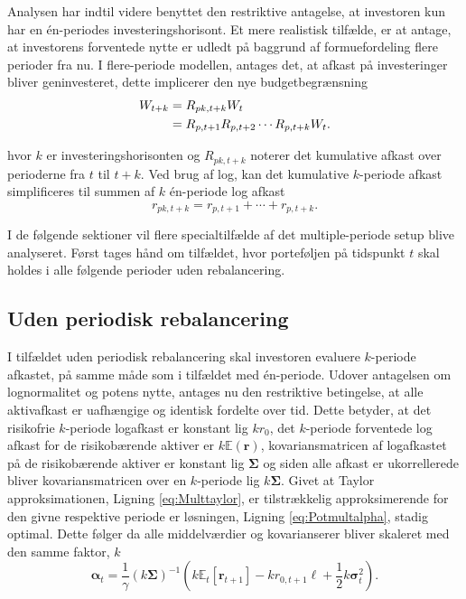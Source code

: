 \documentclass[
  a4paper,
  oneside]{memoir}
\begin{document}
Analysen har indtil videre benyttet den restriktive antagelse, at investoren kun har en én-periodes investeringshorisont. Et mere realistisk tilfælde, er at antage, at investorens forventede nytte er udledt på baggrund af formuefordeling flere perioder fra nu. I flere-periode modellen, antages det, at afkast på investeringer bliver geninvesteret, dette implicerer den nye budgetbegrænsning
\begin{align}
W_{t+k}&=R_{pk,t+k}W_t \notag\\
&=R_{p,t+1}R_{p,t+2}\cdots R_{p,t+k}W_t.
\end{align}

hvor \(k\) er investeringshorisonten og \(R_{pk,t+k}\) noterer det kumulative afkast over perioderne fra \(t\) til \(t+k\). Ved brug af log, kan det kumulative \(k\)-periode afkast simplificeres til summen af \(k\) én-periode log afkast
\begin{equation}
r_{pk,t+k}=r_{p,t+1}+\cdots+r_{p,t+k}. \label{eq:sumportk}
\end{equation}

I de følgende sektioner vil flere specialtilfælde af det multiple-periode setup blive analyseret. Først tages hånd om tilfældet, hvor porteføljen på tidspunkt \(t\) skal holdes i alle følgende perioder uden rebalancering.

\hypertarget{uden-periodisk-rebalancering}{%
\subsection{Uden periodisk rebalancering}\label{uden-periodisk-rebalancering}}

I tilfældet uden periodisk rebalancering skal investoren evaluere \(k\)-periode afkastet, på samme måde som i tilfældet med én-periode. Udover antagelsen om lognormalitet og potens nytte, antages nu den restriktive betingelse, at alle aktivafkast er uafhængige og identisk fordelte over tid. Dette betyder, at det risikofrie \(k\)-periode logafkast er konstant lig \(kr_{0}\), det \(k\)-periode forventede log afkast for de risikobærende aktiver er \(k\mathbb{E}(\bm{r})\), kovariansmatricen af logafkastet på de risikobærende aktiver er konstant lig \(\bm{\Sigma}\) og siden alle afkast er ukorrellerede bliver kovariansmatricen over en \(k\)-periode lig \(k\bm{\Sigma}\). Givet at Taylor approksimationen, Ligning \eqref{eq:Multtaylor}, er tilstrækkelig approksimerende for den givne respektive periode er løsningen, Ligning \eqref{eq:Potmultalpha}, stadig optimal. Dette følger da alle middelværdier og kovarianserer bliver skaleret med den samme faktor, \(k\)
\begin{equation}
\bm{\alpha}_t=\frac{1}{\gamma}(k\bm{\Sigma})^{-1}\left(k\mathbb{E}_t[\bm{r}_{t+1}]-kr_{0,t+1}\bm{\ell}+\frac{1}{2}k\bm{\sigma}_t^2\right). \label{eq:Potmultalphak}
\end{equation}
\end{document}
